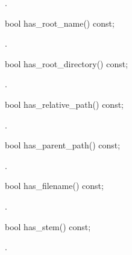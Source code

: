 \begin{itemdescr}
\pnum
\returns
{}.
\end{itemdescr}

%
\begin{itemdecl}
bool has_root_name() const;
\end{itemdecl}

\begin{itemdescr}
\pnum
\returns
{}.
\end{itemdescr}

%
\begin{itemdecl}
bool has_root_directory() const;
\end{itemdecl}

\begin{itemdescr}
\pnum
\returns
{}.
\end{itemdescr}

%
\begin{itemdecl}
bool has_relative_path() const;
\end{itemdecl}

\begin{itemdescr}
\pnum
\returns
{}.
\end{itemdescr}

%
\begin{itemdecl}
bool has_parent_path() const;
\end{itemdecl}

\begin{itemdescr}
\pnum
\returns
{}.
\end{itemdescr}

%
\begin{itemdecl}
bool has_filename() const;
\end{itemdecl}

\begin{itemdescr}
\pnum
\returns
{}.
\end{itemdescr}

%
\begin{itemdecl}
bool has_stem() const;
\end{itemdecl}

\begin{itemdescr}
\pnum
\returns
{}.
\end{itemdescr}


